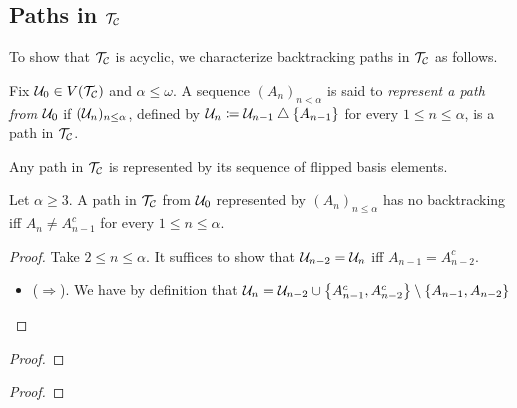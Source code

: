 \documentclass{amsart}
\begin{document}
    \subsection{Paths in $\mathcal{T}_{\mathcal{C}}$}

    To show that $\mathcal{T}_{\mathcal{C}}$ is acyclic, we characterize backtracking paths in $\mathcal{T}_{\mathcal{C}}$ as follows.

    \begin{definition}
        Fix $\mathcal{U}_0\in V(\mathcal{T}_{\mathcal{C}})$ and $\alpha\leq\omega$. A sequence $(A_n)_{n<\alpha}$ is said to \textit{represent a path from $\mathcal{U}_0$} if $(\mathcal{U}_n)_{n\leq\alpha}$, defined by $\mathcal{U}_n\coloneqq\mathcal{U}_{n-1}\bigtriangleup\left\{A_{n-1}\right\}$ for every $1\leq n\leq\alpha$, is a path in $\mathcal{T}_{\mathcal{C}}$.
    \end{definition}

    \begin{remark}
        Any path in $\mathcal{T}_{\mathcal{C}}$ is represented by its sequence of flipped basis elements.
    \end{remark}

    \begin{lemma}
        Let $\alpha\geq3$. A path in $\mathcal{T}_{\mathcal{C}}$ from $\mathcal{U}_0$ represented by $(A_n)_{n\leq\alpha}$ has no backtracking iff $A_n\neq A_{n-1}^c$ for every $1\leq n\leq\alpha$.
    \end{lemma}
    \begin{proof}
        Take $2\leq n\leq\alpha$. It suffices to show that $\mathcal{U}_{n-2}=\mathcal{U}_n$ iff $A_{n-1}=A_{n-2}^c$.
        \begin{itemize}
            \item ($\Rightarrow$). We have by definition that $\mathcal{U}_n=\mathcal{U}_{n-2}\cup\left\{A_{n-1}^c,A_{n-2}^c\right\}\setminus\left\{A_{n-1},A_{n-2}\right\}$
        \end{itemize}
    \end{proof}

    \begin{proposition}\label{acyclic}
        
    \end{proposition}
    \begin{proof}
        
    \end{proof}
    
    \begin{proposition}\label{tree}
        
    \end{proposition}
    \begin{proof}
        
    \end{proof}
\end{document}
